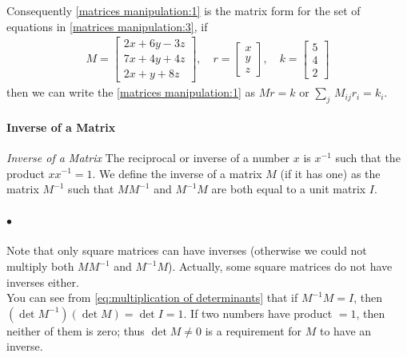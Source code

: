             Consequently \eqref{matrices manipulation:1} is the matrix form for the set 
            of equations in \eqref{matrices manipulation:3}, if
            \begin{align}
                \label{matrices manipulation:4}
                M=\begin{bmatrix}
                    2x+6y-3z \\
                    7x+4y+4z \\
                    2x+y+8z
                \end{bmatrix}, \quad
                r=\begin{bmatrix}
                    x\\ y\\ z
                \end{bmatrix}, \quad
                k=\begin{bmatrix}
                    5 \\ 4 \\2
                \end{bmatrix}
            \end{align}
            then we can write the \eqref{matrices manipulation:1} as $Mr=k$ or $\sum_j\, M_{ij}r_i=k_i$.

            \paragraph{Inverse of a Matrix} %
            \label{par:Inverse of a Matrix}
            \textit{Inverse of a Matrix} The reciprocal or inverse of a number $x$ is $x^{-1}$ such that the product 
            $xx^{-1} = 1$. We define the inverse of a matrix $M$ (if it has one) as the matrix $M^{-1}$ such that 
            $MM^{-1}$ and $M^{-1}M$ are both equal to a unit matrix $I$.
            \paragraph{$\bullet$} Note that only square matrices can have inverses 
            (otherwise we could not multiply both $MM^{-1}$ and $M^{-1}M$). Actually, some square matrices do 
            not have inverses either. \\You can see from \eqref{eq:multiplication of determinants} 
            that if $M^{-1}M = I$, then 
            $(\det{M^{-1}})(\det{M}) = \det{I} = 1$. If two numbers have product $= 1$, then neither of them is 
            zero; thus $\det{M} \neq 0$ is a requirement for $M$ to have an inverse.

